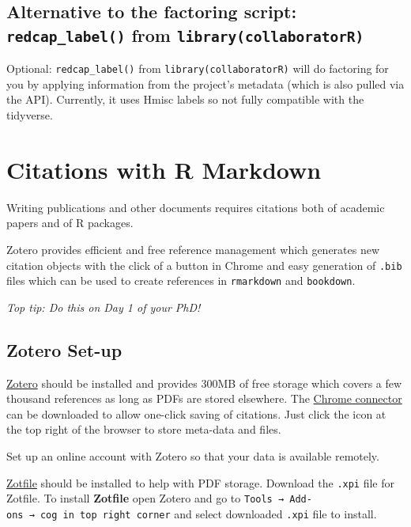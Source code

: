 \documentclass[
]{book}
\begin{document}
\hypertarget{alternative-to-the-factoring-script-redcap_label-from-librarycollaboratorr}{%
\section{\texorpdfstring{Alternative to the factoring script: \texttt{redcap\_label()} from \texttt{library(collaboratorR)}}{Alternative to the factoring script: redcap\_label() from library(collaboratorR)}}\label{alternative-to-the-factoring-script-redcap_label-from-librarycollaboratorr}}

Optional: \texttt{redcap\_label()} from \texttt{library(collaboratorR)} will do factoring for you by applying information from the project's metadata (which is also pulled via the API). Currently, it uses Hmisc labels so not fully compatible with the tidyverse.

\hypertarget{citations-with-r-markdown}{%
\chapter{Citations with R Markdown}\label{citations-with-r-markdown}}

Writing publications and other documents requires citations both of academic papers and of R packages.

Zotero provides efficient and free reference management which generates new citation objects with the click of a button in Chrome and easy generation of \texttt{.bib} files which can be used to create references in \texttt{rmarkdown} and \texttt{bookdown}.

\emph{Top tip: Do this on Day 1 of your PhD!}

\hypertarget{zotero-set-up}{%
\section{Zotero Set-up}\label{zotero-set-up}}

\href{https://www.zotero.org/download/}{Zotero} should be installed and provides 300MB of free storage which covers a few thousand references as long as PDFs are stored elsewhere. The \href{https://www.zotero.org/download/}{Chrome connector} can be downloaded to allow one-click saving of citations. Just click the icon at the top right of the browser to store meta-data and files.

Set up an online account with Zotero so that your data is available remotely.

\href{https://www.zotero.org/support/plugins}{Zotfile} should be installed to help with PDF storage. Download the \texttt{.xpi} file for Zotfile. To install \textbf{Zotfile} open Zotero and go to \texttt{Tools\ →\ Add-ons\ →\ cog\ in\ top\ right\ corner} and select downloaded \texttt{.xpi} file to install.
\end{document}
